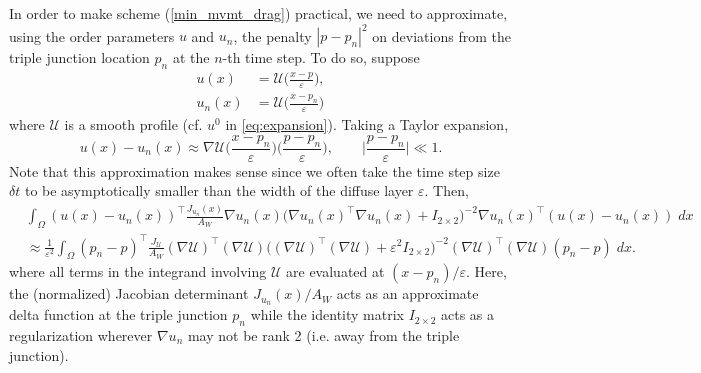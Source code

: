 \documentclass{article}
\theoremstyle{plain}
\theoremstyle{definition}
\theoremstyle{remark}
\newcommand{\eps}{\varepsilon}
\begin{document}
In order to make scheme (\ref{min_mvmt_drag}) practical, we need to approximate, using the order parameters $u$ and $u_n$, the penalty $|p-p_n|^2$ on deviations from the triple junction location $p_n$ at the $n$-th time step. To do so, suppose 
\begin{equation}
\begin{split}
    u(x) &= \mathcal{U}\bigg(\frac{x-p}{\eps}\bigg),\\
    u_n(x) &= \mathcal{U}\bigg(\frac{x-p_n}{\eps}\bigg)
\end{split}
\end{equation}
where $\mathcal{U}$ is a smooth profile (cf. $u^0$ in \eqref{eq:expansion}). Taking a Taylor expansion,
\begin{equation}
    u(x) - u_n(x) \approx \nabla \mathcal{U}\bigg(\frac{x-p_n}{\eps}\bigg)\bigg(\frac{p-p_n}{\eps}\bigg), \qquad \bigg|\frac{p-p_n}{\eps}\bigg| \ll 1.
\end{equation}
Note that this approximation makes sense since we often take the time step size $\delta t$ to be asymptotically smaller than the width of the diffuse layer $\eps$. Then,
\begin{equation}\label{eq:tjperturbation}
\begin{split}
    &\int_\Omega (u(x) - u_n(x))^\top \frac{J_{u_n}(x)}{A_W}\nabla u_n(x) \big( \nabla u_n(x)^\top  \nabla u_n(x) + I_{2\times 2}\big)^{-2}\nabla u_n(x)^\top (u(x) - u_n(x)) \; dx \\
    &\approx \frac{1}{\eps^2} \int_\Omega (p_n - p)^\top \frac{J_\mathcal{U}}{A_W}(\nabla\mathcal{U})^\top (\nabla\mathcal{U})\bigg((\nabla\mathcal{U})^\top (\nabla\mathcal{U}) + \eps^2 I_{2\times 2}\bigg)^{-2} (\nabla\mathcal{U})^\top (\nabla\mathcal{U}) (p_n - p)\;dx.
\end{split}
\end{equation}
where all terms in the integrand involving $\mathcal{U}$ are evaluated at $(x-p_n)/\eps$. Here, the (normalized) Jacobian determinant $J_{u_n}(x)/A_W$ acts as an approximate delta function at the triple junction $p_n$ while the identity matrix $I_{2\times 2}$ acts as a regularization wherever $\nabla u_n$ may not be rank 2 (i.e. away from the triple junction).
\end{document}
